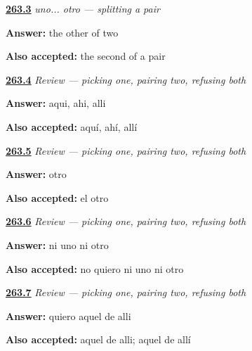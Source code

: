 \noindent\begin{minipage}[t]{\linewidth}
\raggedright
\hyperlink{review-ES-C67-uno-otro-latin}{\textbf{263.3}} \emph{uno... otro — splitting a pair}\par
\small \textbf{Answer:} the other of two\par
\footnotesize \textbf{Also accepted:} the second of a pair
\end{minipage}\par\medskip

\noindent\begin{minipage}[t]{\linewidth}
\raggedright
\hyperlink{review-ES-C67-repaso-uno-otro-ninguno-distancias}{\textbf{263.4}} \emph{Review — picking one, pairing two, refusing both}\par
\small \textbf{Answer:} aqui, ahi, alli\par
\footnotesize \textbf{Also accepted:} aquí, ahí, allí
\end{minipage}\par\medskip

\noindent\begin{minipage}[t]{\linewidth}
\raggedright
\hyperlink{review-ES-C67-repaso-uno-otro-ninguno-pareja}{\textbf{263.5}} \emph{Review — picking one, pairing two, refusing both}\par
\small \textbf{Answer:} otro\par
\footnotesize \textbf{Also accepted:} el otro
\end{minipage}\par\medskip

\noindent\begin{minipage}[t]{\linewidth}
\raggedright
\hyperlink{review-ES-C67-repaso-uno-otro-ninguno-rechazo}{\textbf{263.6}} \emph{Review — picking one, pairing two, refusing both}\par
\small \textbf{Answer:} ni uno ni otro\par
\footnotesize \textbf{Also accepted:} no quiero ni uno ni otro
\end{minipage}\par\medskip

\noindent\begin{minipage}[t]{\linewidth}
\raggedright
\hyperlink{review-ES-C67-repaso-uno-otro-ninguno-lejos}{\textbf{263.7}} \emph{Review — picking one, pairing two, refusing both}\par
\small \textbf{Answer:} quiero aquel de alli\par
\footnotesize \textbf{Also accepted:} aquel de alli; aquel de allí
\end{minipage}\par\medskip

